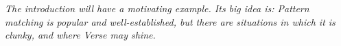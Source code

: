 \documentclass[manuscript,screen,review, 12pt]{acmart}
\begin{document}

\bigskip 
\it{The introduction will have a motivating example. Its big idea is: Pattern
matching is popular and well-established, but there are situations in which it
is clunky, and where Verse may shine.}
\bigskip 

\end{document}
